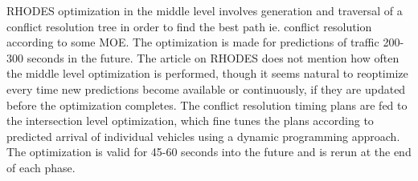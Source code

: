 RHODES optimization in the middle level involves generation and
traversal of a conflict resolution tree in order to find the best path
ie. conflict resolution according to some MOE. The optimization is
made for predictions of traffic 200-300 seconds in the future. The
article on RHODES does not mention how often the middle level
optimization is performed, though it seems natural to reoptimize every
time new predictions become available or continuously, if they are
updated before the optimization completes.  The conflict resolution
timing plans are fed to the intersection level optimization, which
fine tunes the plans according to predicted arrival of individual
vehicles using a dynamic programming approach. The optimization is
valid for 45-60 seconds into the future and is rerun at the end of
each phase.
